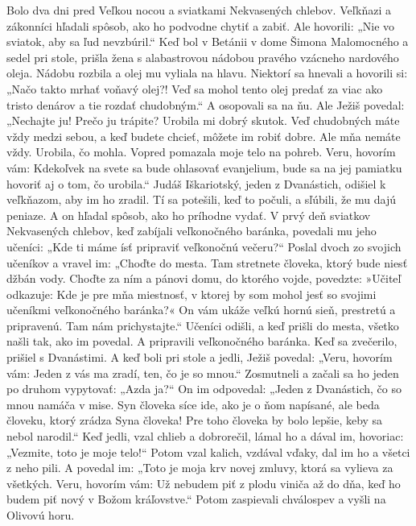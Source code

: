 Bolo dva dni pred Veľkou nocou a sviatkami Nekvasených chlebov. Veľkňazi a zákonníci hľadali spôsob, ako ho podvodne chytiť a zabiť. Ale hovorili: „Nie vo sviatok, aby sa ľud nevzbúril.“
\versseparator
Keď bol v Betánii v dome Šimona Malomocného a sedel pri stole, prišla žena s alabastrovou nádobou pravého vzácneho nardového oleja. Nádobu rozbila a olej mu vyliala na hlavu. Niektorí sa hnevali a hovorili si: „Načo takto mrhať voňavý olej?! Veď sa mohol tento olej predať za viac ako tristo denárov a tie rozdať chudobným.“ A osopovali sa na ňu.
Ale Ježiš povedal: „Nechajte ju! Prečo ju trápite? Urobila mi dobrý skutok. Veď chudobných máte vždy medzi sebou, a keď budete chcieť, môžete im robiť dobre. Ale mňa nemáte vždy.
Urobila, čo mohla. Vopred pomazala moje telo na pohreb. Veru, hovorím vám: Kdekoľvek na svete sa bude ohlasovať evanjelium, bude sa na jej pamiatku hovoriť aj o tom, čo urobila.“
\versseparator
Judáš Iškariotský, jeden z Dvanástich, odišiel k veľkňazom, aby im ho zradil. Tí sa potešili, keď to počuli, a sľúbili, že mu dajú peniaze. A on hľadal spôsob, ako ho príhodne vydať.
\versseparator
V prvý deň sviatkov Nekvasených chlebov, keď zabíjali veľkonočného baránka, povedali mu jeho učeníci: „Kde ti máme ísť pripraviť veľkonočnú večeru?“ Poslal dvoch zo svojich učeníkov a vravel im: „Choďte do mesta. Tam stretnete človeka, ktorý bude niesť džbán vody. Choďte za ním
a pánovi domu, do ktorého vojde, povedzte: »Učiteľ odkazuje: Kde je pre mňa miestnosť, v ktorej by som mohol jesť so svojimi učeníkmi veľkonočného baránka?« On vám ukáže veľkú hornú sieň, prestretú a pripravenú. Tam nám prichystajte.“ Učeníci odišli, a keď prišli do mesta, všetko našli tak, ako im povedal. A pripravili veľkonočného baránka.
\versseparator
Keď sa zvečerilo, prišiel s Dvanástimi.
A keď boli pri stole a jedli, Ježiš povedal: „Veru, hovorím vám: Jeden z vás ma zradí, ten, čo je so mnou.“ Zosmutneli a začali sa ho jeden po druhom vypytovať: „Azda ja?“ On im odpovedal: „Jeden z Dvanástich, čo so mnou namáča v mise. Syn človeka síce ide, ako je o ňom napísané, ale beda človeku, ktorý zrádza Syna človeka! Pre toho človeka by bolo lepšie, keby sa nebol narodil.“
\versseparator
Keď jedli, vzal chlieb a dobrorečil, lámal ho a dával im, hovoriac: „Vezmite, toto je moje telo!“ Potom vzal kalich, vzdával vďaky, dal im ho a všetci z neho pili. A povedal im: „Toto je moja krv novej zmluvy, ktorá sa vylieva za všetkých. Veru, hovorím vám: Už nebudem piť z plodu viniča až do dňa, keď ho budem piť nový v Božom kráľovstve.“
\versseparator
Potom zaspievali chválospev a vyšli na Olivovú horu.
